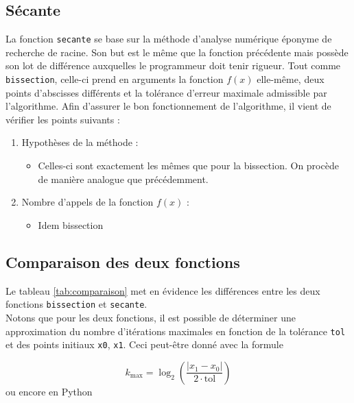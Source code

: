 \documentclass[12pt]{article}
\begin{document}
\subsection{Sécante}
    La fonction \texttt{secante} se base sur la méthode d'analyse numérique éponyme de recherche de racine. Son but est le même que la fonction précédente mais possède son lot de différence auxquelles le programmeur doit tenir rigueur. Tout comme \texttt{bissection}, celle-ci prend en arguments la fonction $f(x)$ elle-même, deux points d'abscisses différents et la tolérance d'erreur maximale admissible par l'algorithme. Afin d'assurer le bon fonctionnement de l'algorithme, il vient de vérifier les points suivants :
\begin{enumerate}[label=\roman*.]
    \item Hypothèses de la méthode : 
        \begin{itemize}
            \item Celles-ci sont exactement les mêmes que pour la bissection. On procède de manière analogue que précédemment.
        \end{itemize}
        
    \item 
    Nombre d'appels de la fonction $f(x)$ : 
        \begin{itemize}
            \item Idem bissection
        \end{itemize}
        
\end{enumerate}

\subsection{Comparaison des deux fonctions}

Le tableau \ref{tab:comparaison} met en évidence les différences entre les deux fonctions \texttt{bissection} et \texttt{secante}. \\
Notons que pour les deux fonctions, il est possible de déterminer une approximation du nombre d'itérations maximales en fonction de la tolérance \texttt{tol} et des points initiaux \texttt{x0}, \texttt{x1}. Ceci peut-être donné avec la formule

\begin{equation}
    k_{\text{max}} = \log_2 \left( \frac{|x_1 - x_0|}{2 \cdot \text{tol}} \right)
    \label{eq:k_max}
\end{equation}
ou encore en Python
\end{document}
